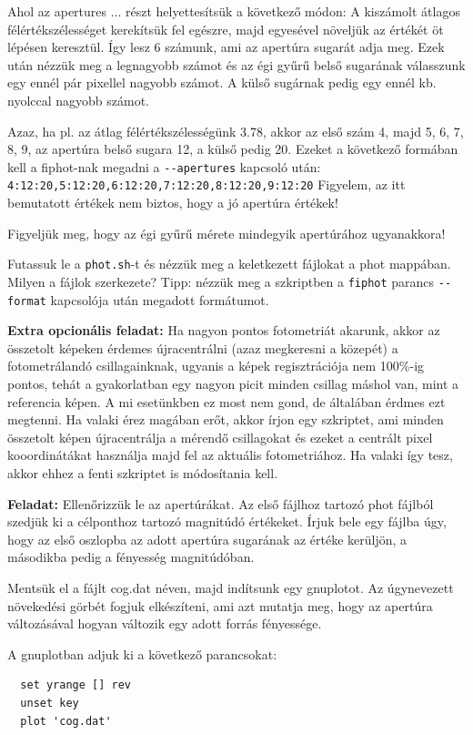 \documentclass{article}
\begin{document}
Ahol az apertures ... részt helyettesítsük a következő módon:
A kiszámolt átlagos félértékszélességet kerekítsük fel egészre, majd egyesével
növeljük az értékét öt lépésen keresztül. Így lesz 6 számunk, ami az apertúra
sugarát adja meg. Ezek után nézzük meg a legnagyobb számot és az égi gyűrű belső
sugarának válasszunk egy ennél pár pixellel nagyobb számot. A külső sugárnak
pedig egy ennél kb. nyolccal nagyobb számot.

Azaz, ha pl. az átlag félértékszélességünk 3.78, akkor az első szám 4, majd 5,
6, 7, 8, 9, az apertúra belső sugara 12, a külső pedig 20.
Ezeket a következő formában kell a fiphot-nak megadni a \verb+--apertures+ kapcsoló után: \verb+4:12:20,5:12:20,6:12:20,7:12:20,8:12:20,9:12:20+
Figyelem, az itt bemutatott értékek nem biztos, hogy a jó apertúra értékek!

Figyeljük meg, hogy az égi gyűrű mérete mindegyik apertúrához ugyanakkora!

Futassuk le a \verb+phot.sh+-t és nézzük meg a keletkezett fájlokat a phot mappában.
Milyen a fájlok szerkezete? Tipp: nézzük meg a szkriptben a \verb+fiphot+ parancs
\verb+--format+ kapcsolója után megadott formátumot.


{\bf Extra opcionális feladat:}
Ha nagyon pontos fotometriát akarunk, akkor az összetolt képeken érdemes
újracentrálni (azaz megkeresni a közepét) a fotometrálandó csillagainknak,
ugyanis a képek regisztrációja nem 100\%-ig pontos, tehát a gyakorlatban egy
nagyon picit minden csillag máshol van, mint a referencia képen. A mi
esetünkben ez most nem gond, de általában érdmes ezt megtenni.
Ha valaki érez magában erőt, akkor írjon egy szkriptet, ami minden összetolt
képen újracentrálja a mérendő csillagokat és ezeket a centrált pixel
kooordinátákat használja majd fel az aktuális fotometriához. Ha valaki így
tesz, akkor ehhez a fenti szkriptet is módosítania kell.


{\bf Feladat:}
Ellenőrizzük le az apertúrákat.
Az első fájlhoz tartozó phot fájlból szedjük ki a célponthoz tartozó
magnitúdó értékeket. Írjuk bele egy fájlba úgy, hogy az első oszlopba az adott
apertúra sugarának az értéke kerüljön, a másodikba pedig a fényesség
magnitúdóban.

Mentsük el a fájlt cog.dat néven, majd indítsunk egy gnuplotot. Az úgynevezett
növekedési görbét fogjuk elkészíteni, ami azt mutatja meg, hogy az apertúra
változásával hogyan változik egy adott forrás fényessége.

A gnuplotban adjuk ki a következő parancsokat:
\begin{verbatim}
  set yrange [] rev
  unset key
  plot 'cog.dat'
\end{verbatim}
\end{document}
